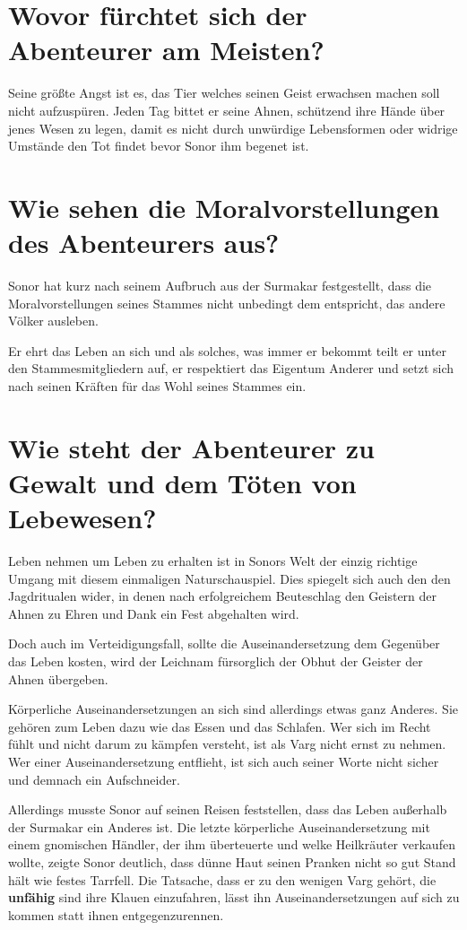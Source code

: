 	
	\section[Ängste]{Wovor fürchtet sich der Abenteurer am Meisten?}

	Seine größte Angst ist es, das Tier welches seinen Geist erwachsen
	machen soll nicht aufzuspüren. Jeden Tag bittet er seine Ahnen,
	schützend ihre Hände über jenes Wesen zu legen, damit es nicht durch
	unwürdige Lebensformen oder widrige Umstände den Tot findet bevor Sonor
	ihm begenet ist.


	\section[Moral]{Wie sehen die Moralvorstellungen des Abenteurers aus?}
	

	Sonor hat kurz nach seinem Aufbruch aus der Surmakar festgestellt, dass
	die Moralvorstellungen seines Stammes nicht unbedingt dem entspricht,
	das andere Völker ausleben. 

	Er ehrt das Leben an sich und als solches, was immer er bekommt teilt er
	unter den Stammesmitgliedern auf, er respektiert das Eigentum Anderer
	und setzt sich nach seinen Kräften für das Wohl seines Stammes ein.


	\section[Frustrationstoleranz]{Wie steht der Abenteurer zu Gewalt und dem Töten von Lebewesen?}


	Leben nehmen um Leben zu erhalten ist in Sonors Welt der einzig richtige
	Umgang mit diesem einmaligen Naturschauspiel. Dies spiegelt sich auch
	den den Jagdritualen wider, in denen nach erfolgreichem Beuteschlag den
	Geistern der Ahnen zu Ehren und Dank ein Fest abgehalten wird.

	Doch auch im Verteidigungsfall, sollte die Auseinandersetzung dem
	Gegenüber das Leben kosten, wird der Leichnam fürsorglich der Obhut der
	Geister der Ahnen übergeben.

	Körperliche Auseinandersetzungen an sich sind allerdings etwas ganz
	Anderes. Sie gehören zum Leben dazu wie das Essen und das Schlafen.
	Wer sich im Recht fühlt und nicht darum zu kämpfen versteht, ist als
	Varg nicht ernst zu nehmen. Wer einer Auseinandersetzung entflieht,
	ist sich auch seiner Worte nicht sicher und demnach ein Aufschneider.

	Allerdings musste Sonor auf seinen Reisen feststellen, dass das Leben
	außerhalb der Surmakar ein Anderes ist. Die letzte körperliche
	Auseinandersetzung mit einem gnomischen Händler, der ihm überteuerte
	und welke Heilkräuter verkaufen wollte, zeigte Sonor deutlich, dass
	dünne Haut seinen Pranken nicht so gut Stand hält wie festes Tarrfell.
	Die Tatsache, dass er zu den wenigen Varg gehört, die \textbf{unfähig}
	sind ihre Klauen einzufahren, lässt ihn Auseinandersetzungen auf sich zu
	kommen statt ihnen entgegenzurennen.


